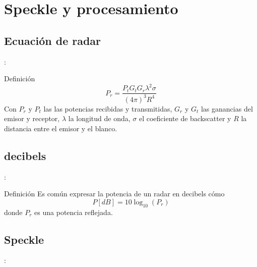 \section{Speckle y procesamiento}

\subsection{Ecuación de radar}
\begin{frame}{\secname : \subsecname}
    \begin{block}{Definición}
      \begin{equation}
        P_r = \frac{P_t G_t G_r \lambda^2 \sigma}{(4\pi)^3 R^4}
      \end{equation}
      Con $P_r$ y $P_t$ las las potencias recibidas y transmitidas, $G_r$ y $G_t$ las ganancias del emisor y receptor, $\lambda$ la longitud de onda, $\sigma$ el coeficiente de backscatter y $R$ la distancia entre el emisor y el blanco.
    \end{block}
\end{frame}

\subsection{decibels}
\begin{frame}{\secname : \subsecname}
    \begin{block}{Definición}
      Es común expresar la potencia de un radar en decibels cómo
      \begin{equation}
        P [dB] = 10\log_{10}(P_r)
      \end{equation}
      donde $P_r$ es una potencia reflejada.
    \end{block}
\end{frame}

\subsection{Speckle}
\begin{frame}{\secname : \subsecname}
  \begin{figure}
    \centering
    \caption{ }
    \label{}
  \end{figure}
\end{frame}

